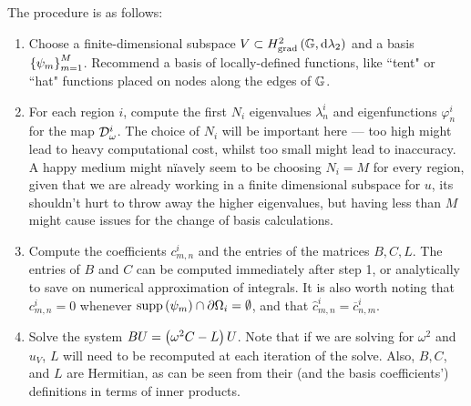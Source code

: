The procedure is as follows:
\begin{enumerate}
	\item Choose a finite-dimensional subspace $V\subset H^2_\mathrm{grad}\left( \mathbb{G}, \mathrm{d}\lambda_2 \right)$ and a basis $\left\{ \psi_m \right\}_{m=1}^M$.
	Recommend a basis of locally-defined functions, like ``tent" or ``hat" functions placed on nodes along the edges of $\mathbb{G}$.
	\item For each region $i$, compute the first $N_i$ eigenvalues $\lambda_n^i$ and eigenfunctions $\varphi_n^i$ for the map $\mathcal{D}_{\omega}^i$.
	The choice of $N_i$ will be important here --- too high might lead to heavy computational cost, whilst too small might lead to inaccuracy.
	A happy medium might n\"iavely seem to be choosing $N_i = M$ for every region, given that we are already working in a finite dimensional subspace for $u$, its shouldn't hurt to throw away the higher eigenvalues, but having less than $M$ might cause issues for the change of basis calculations.
	\item Compute the coefficients $c_{m,n}^i$ and the entries of the matrices $B, C, L$.
	The entries of $B$ and $C$ can be computed immediately after step 1, or analytically to save on numerical approximation of integrals.
	It is also worth noting that $c_{m,n}^i=0$ whenever $\mathrm{supp}\left( \psi_m \right)\cap\partial\Omega_i = \emptyset$, and that $\hat{c}_{m,n}^i=\overline{c}_{n,m}^i$.
	\item Solve the system $B U = \left( \omega^2 C - L \right) U$.
	Note that if we are solving for $\omega^2$ and $u_V$, $L$ will need to be recomputed at each iteration of the solve.
	Also, $B, C$, and $L$ are Hermitian, as can be seen from their (and the basis coefficients') definitions in terms of inner products.
\end{enumerate}

